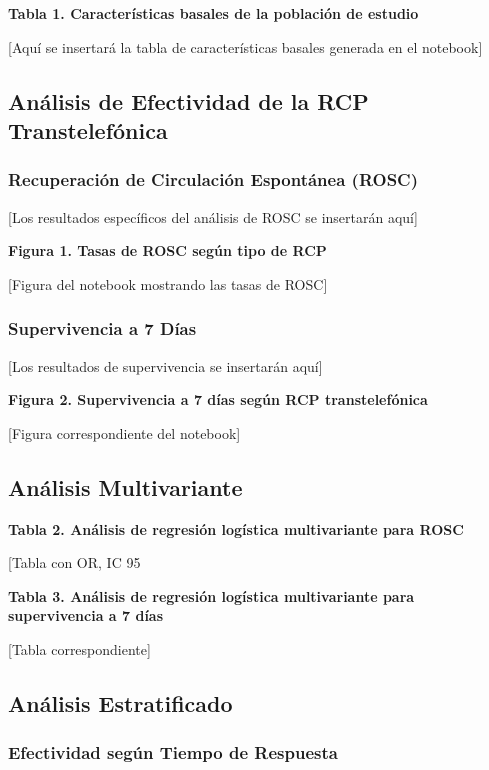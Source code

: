 \documentclass[10pt,a4paper]{article}
\begin{document}
\begin{multicols}{2}
\textbf{Tabla 1. Características basales de la población de estudio}

[Aquí se insertará la tabla de características basales generada en el notebook]

\subsection{Análisis de Efectividad de la RCP Transtelefónica}

\subsubsection{Recuperación de Circulación Espontánea (ROSC)}

[Los resultados específicos del análisis de ROSC se insertarán aquí]

\textbf{Figura 1. Tasas de ROSC según tipo de RCP}

[Figura del notebook mostrando las tasas de ROSC]

\subsubsection{Supervivencia a 7 Días}

[Los resultados de supervivencia se insertarán aquí]

\textbf{Figura 2. Supervivencia a 7 días según RCP transtelefónica}

[Figura correspondiente del notebook]

\subsection{Análisis Multivariante}

\textbf{Tabla 2. Análisis de regresión logística multivariante para ROSC}

[Tabla con OR, IC 95%

\textbf{Tabla 3. Análisis de regresión logística multivariante para supervivencia a 7 días}

[Tabla correspondiente]

\subsection{Análisis Estratificado}

\subsubsection{Efectividad según Tiempo de Respuesta}


\end{multicols}
\end{document}
